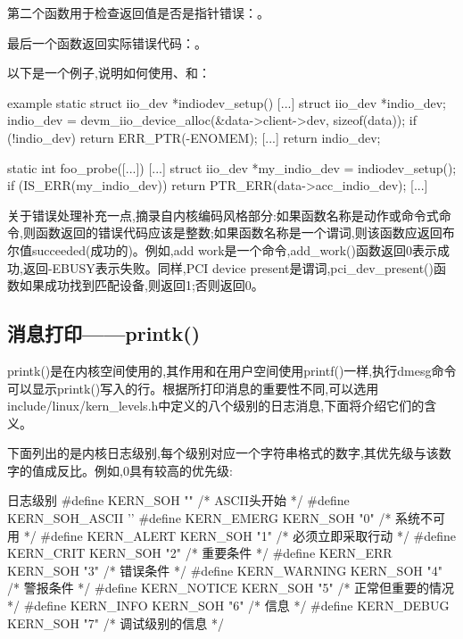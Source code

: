 \documentclass[lang=cn,newtx,10pt,scheme=chinese]{elegantbook}
\begin{document}
第二个函数用于检查返回值是否是指针错误：。

最后一个函数返回实际错误代码：。

以下是一个例子,说明如何使用、和：

\begin{mycode}{example}
static struct iio_dev *indiodev_setup(){
    [...]
    struct iio_dev *indio_dev;
    indio_dev = devm_iio_device_alloc(&data->client->dev, sizeof(data));
    if (!indio_dev)
        return ERR_PTR(-ENOMEM);
    [...]
    return indio_dev;
}

static int foo_probe([...]){
    [...]
    struct iio_dev *my_indio_dev = indiodev_setup();
    if (IS_ERR(my_indio_dev))
        return PTR_ERR(data->acc_indio_dev);
    [...]
}
\end{mycode}

\begin{marker}
关于错误处理补充一点,摘录自内核编码风格部分:如果函数名称是动作或命令式命令,则函数返回的错误代码应该是整数;如果函数名称是一个谓词,则该函数应返回布尔值succeeded(成功的)。例如,add
work是一个命令,add\_work()函数返回0表示成功,返回-EBUSY表示失败。同样,PCI device present是谓词,pci\_dev\_present()函数如果成功找到匹配设备,则返回1;否则返回0。
\end{marker}

\subsection{消息打印——printk()}

printk()是在内核空间使用的,其作用和在用户空间使用printf()一样,执行dmesg命令可以显示printk()写入的行。根据所打印消息的重要性不同,可以选用include/linux/kern\_levels.h中定义的八个级别的日志消息,下面将介绍它们的含义。

下面列出的是内核日志级别,每个级别对应一个字符串格式的数字,其优先级与该数字的值成反比。例如,0具有较高的优先级:

\begin{mycode}{日志级别}
#define KERN_SOH                ""          /* ASCII头开始 */
#define KERN_SOH_ASCII          ''
#define KERN_EMERG              KERN_SOH "0"    /* 系统不可用 */
#define KERN_ALERT              KERN_SOH "1"    /* 必须立即采取行动 */
#define KERN_CRIT               KERN_SOH "2"    /* 重要条件 */
#define KERN_ERR                KERN_SOH "3"    /* 错误条件 */
#define KERN_WARNING            KERN_SOH "4"    /* 警报条件 */
#define KERN_NOTICE             KERN_SOH "5"    /* 正常但重要的情况 */
#define KERN_INFO               KERN_SOH "6"    /* 信息 */
#define KERN_DEBUG              KERN_SOH "7"    /* 调试级别的信息 */
\end{mycode}
\end{document}
